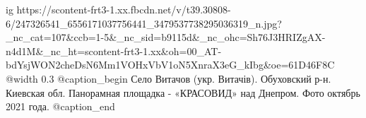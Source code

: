  
 
 
 
 

\ifcmt
  ig https://scontent-frt3-1.xx.fbcdn.net/v/t39.30808-6/247326541_6556171037756441_3479537738295036319_n.jpg?_nc_cat=107&ccb=1-5&_nc_sid=b9115d&_nc_ohc=Sh76J3HRIZgAX-n4d1M&_nc_ht=scontent-frt3-1.xx&oh=00_AT-bdYsjWON2cheDsN6Mm1VOHxVbV1oN5XnraX3eG_kIbg&oe=61D46F8C
  @width 0.3
  @caption_begin
    Село Витачов (укр. Витачів). Обуховский р-н. Киевская обл. 
    Панорамная площадка - «КРАСОВИД» над Днепром. Фото октябрь 2021 года.
  @caption_end
\fi

